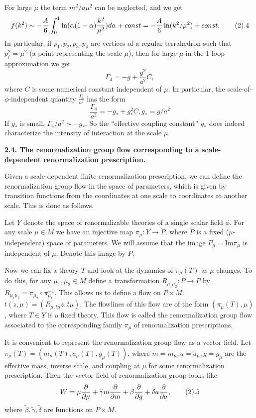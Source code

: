 For large $\mu$ the term $m^2/a\mu^2$ can be neglected, and we get
$$
f(k^2)\sim -\frac{A}{6}\int_0^1\ln(\alpha(1-\alpha)\frac{k^2}{\mu^2})d\alpha+const=
-\frac{A}{6}\ln(k^2/\mu^2)+const,\tag 2.4
$$
In particular, if $p_1,p_2,p_3,p_4$ are vertices 
of a regular terrahedron such that $p_i^2=\mu^2$
(a point representing the scale $\mu$), then for large $\mu$ in
the 1-loop approximation we get
$$
\Gamma_4=-g+\frac{g^2}{a^2}C,
$$
where $C$ is some numerical constant independent of $\mu$. 
In particular, the scale-of-$\phi$-independent quantity
$\frac{\Gamma_4}{a^2}$ has the form
$$
\frac{\Gamma_4}{a^2}=-g_*+g_*^2C, g_*=g/a^2
$$
If $g_*$ is small, $\Gamma_4/a^2\sim -g_*$. So the ``effective coupling 
constant'' $g_*$ does indeed characterize the intensity 
of interaction at the scale $\mu$. 

{\bf 2.4. The renormalization group flow 
corresponding to a scale-dependent renormalization prescription.}

Given a scale-dependent finite
renormalization prescription, we can define the
renormalization group flow in the space of parameters,
which is given by transition functions from the coordinates
at one scale to coordinates at another scale. This is done as follows. 

Let $Y$ denote the space of renormalizable theories of a single 
scalar field $\phi$.
For any scale $\mu\in M$ we have an injective map
$\pi_\mu: Y\to \tilde P$, where $\tilde P$ is a fixed ($\mu$-independent) 
space of parameters. 
We will assume that the image $P_\mu=\text{Im}\pi_\mu$ is independent
of $\mu$. Denote this image by $P$. 

Now we can fix a theory $T$ and look at the dynamics
of $\pi_\mu(T)$ as $\mu$ changes.
To do this, for any $\mu_1,\mu_2\in M$ define 
a transformation $R_{\mu_1\mu_2}: P\to P$ by 
$R_{\mu_1\mu_2}=\pi_{\mu_2}\circ \pi_{\mu_1}^{-1}$. 
This allows us to define a flow on $P\times M$:
$t(z,\mu)=(R_{\mu,t\mu}z,t\mu)$. The flowlines of this flow 
 are of the form
$(\pi_\mu(T),\mu)$, where $T\in Y$ is a fixed theory.
This flow is called the renormalization group flow
associated to the corresponding family 
$\pi_\mu$ of renormalization prescriptions.

It is convenient to represent the renormalization group flow as a 
vector field. Let $\pi_\mu(T)=(m_\mu(T),a_\mu(T),g_\mu(T))$, where 
$m=m_\mu,a=a_\mu,g=g_\mu$ are the effective mass, inverse scale, and coupling 
at $\mu$ for some renormalization prescription. Then the vector 
field of renormalization group looks like
$$
W=\mu\frac{\d}{\d\mu}+\tilde\gamma m\frac{\d}{\d m}+\tilde\beta
\frac{\d }{\d g}
+\tilde\delta a\frac{\d}{\d a},\tag 2.5
$$
where $\tilde\beta,\tilde\gamma,\tilde\delta$ are functions on $P\times M$. 

